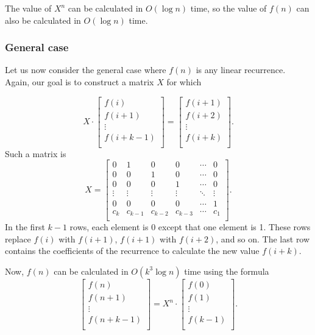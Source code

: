 The value of $X^n$ can be calculated in
$O(\log n)$ time,
so the value of $f(n)$ can also be calculated
in $O(\log n)$ time.

\subsubsection{General case}

Let us now consider the general case where
$f(n)$ is any linear recurrence.
Again, our goal is to construct a matrix $X$
for which

\[ X \cdot
 \begin{bmatrix}
  f(i) \\
  f(i+1) \\
  \vdots \\
  f(i+k-1) \\
 \end{bmatrix}
=
 \begin{bmatrix}
  f(i+1) \\
  f(i+2) \\
  \vdots \\
  f(i+k) \\
 \end{bmatrix}.
\]
Such a matrix is
\[
X =
 \begin{bmatrix}
  0 & 1 & 0 & 0 & \cdots & 0 \\
  0 & 0 & 1 & 0 & \cdots & 0 \\
  0 & 0 & 0 & 1 & \cdots & 0 \\
  \vdots & \vdots & \vdots & \vdots & \ddots & \vdots \\
  0 & 0 & 0 & 0 & \cdots & 1 \\
  c_k & c_{k-1} & c_{k-2} & c_{k-3} & \cdots & c_1 \\
 \end{bmatrix}.
\]
In the first $k-1$ rows, each element is 0
except that one element is 1.
These rows replace $f(i)$ with $f(i+1)$,
$f(i+1)$ with $f(i+2)$, and so on.
The last row contains the coefficients of the recurrence
to calculate the new value $f(i+k)$.

\begin{samepage}
Now, $f(n)$ can be calculated in
$O(k^3 \log n)$ time using the formula
\[
 \begin{bmatrix}
  f(n) \\
  f(n+1) \\
  \vdots \\
  f(n+k-1) \\
 \end{bmatrix}
=
X^n \cdot
 \begin{bmatrix}
  f(0) \\
  f(1) \\
  \vdots \\
  f(k-1) \\
 \end{bmatrix}.
\]
\end{samepage}

